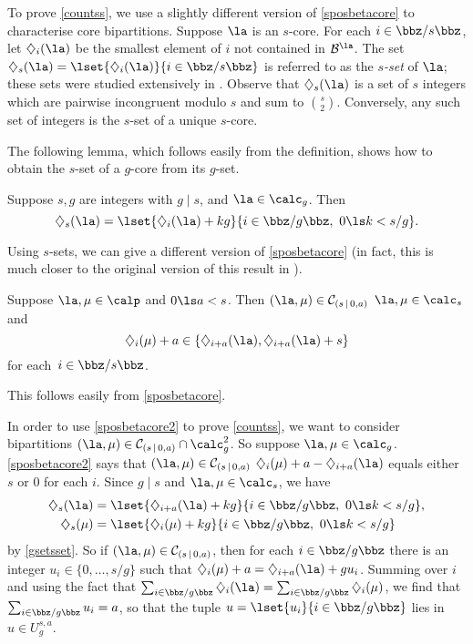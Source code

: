 \documentclass[a4paper, 11pt, twoside]{article}
\begin{document}
To prove \cref{countss}, we use a slightly different version of \ref{sposbetacore} to characterise core bipartitions. Suppose $\la$ is an $s$-core. For each $i\in\zsz$, let $\se i\la$ be the smallest element of $i$ not contained in $\be\la$. The set $\se s\la=\lset{\se i\la}{i\in\zsz}$ is referred to as the \emph{$s$-set} of $\la$; these sets were studied extensively in \cite{mfcores,mfgencores,mfwtarmstrong}. Observe that $\se s\la$ is a set of $s$ integers which are pairwise incongruent modulo $s$ and sum to $\binom s2$. Conversely, any such set of integers is the $s$-set of a unique $s$-core.

The following lemma, which follows easily from the definition, shows how to obtain the $s$-set of a $g$-core from its $g$-set.

\begin{lemma}\label{gsetsset}
Suppose $s,g$ are integers with $g\mid s$, and $\la\in\cores g$. Then
\[
\se s\la=\lset{\se i\la+kg}{i\in\zgz,\ 0\ls k<s/g}.
\]
\end{lemma}

Using $s$-sets, we can give a different version of \ref{sposbetacore} (in fact, this is much closer to the original version of this result in \cite{mfwt}).

\begin{propn}\label{sposbetacore2}
Suppose $\la,\mu\in\calp$ and $0\ls a<s$. Then  $(\la,\mu)\in\mc s{0,a}$ \iff $\la,\mu\in\cores s$ and
\[
\se i\mu+a\in\{\se{i+a}\la,\se{i+a}\la+s\}
\]
for each~$i\in\zsz$.
\end{propn}

\begin{pf}
This follows easily from \ref{sposbetacore}.
\end{pf}

In order to use \cref{sposbetacore2} to prove \cref{countss}, we want to consider bipartitions $(\la,\mu)\in\bc sa\cap \cores g^2$. So suppose $\la,\mu\in\cores g$. \cref{sposbetacore2} says that $(\la,\mu)\in\bc sa$ \iff $\se i\mu+a-\se{i+a}\la$ equals either $s$ or $0$ for each $i$. Since $g\mid s$ and $\la,\mu\in\cores s$, we have
\begin{align*}
\se s\la&=\lset{\se{i+a}\la+kg}{i\in\zgz,\ 0\ls k<s/g},\\\se s\mu&=\lset{\se i\mu+kg}{i\in\zgz,\ 0\ls k<s/g}
\end{align*}
by \cref{gsetsset}. So if $(\la,\mu)\in\bc sa$, then for each $i\in\zgz$ there is an integer $u_i\in\{0,\dots,s/g\}$ such that $\se i\mu+a=\se{i+a}\la+gu_i$. Summing over $i$ and using the fact that $\sum_{i\in\zgz}\se i\la=\sum_{i\in\zgz}\se i\mu$, we find that $\sum_{i\in\zgz}u_i=a$, so that the tuple $u=\lset{u_i}{i\in\zgz}$ lies in $u\in U_g^{s,a}$.
\end{document}
